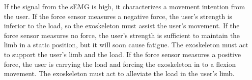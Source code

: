 If the signal from the sEMG is high, it characterizes a movement intention from the user. If the force sensor measures a negative force, the user's strength is inferior to the load, so the exoskeleton must assist the user's movement. If the force sensor measures no force, the user's strength is sufficient to maintain the limb in a static position, but it will soon cause fatigue. The exoskeleton must act to support the user's limb and the load. If the force sensor measures a positive force, the user is carrying the load and forcing the exoskeleton in to a flexion movement. The exoskeleton must act to alleviate the load in the user's limb.